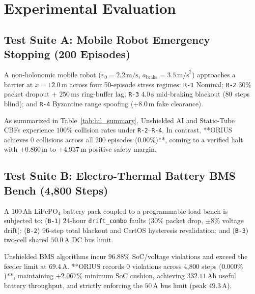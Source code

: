 \documentclass[conference]{IEEEtran}
\begin{document}
\section{Experimental Evaluation}

\subsection{Test Suite A: Mobile Robot Emergency Stopping (200 Episodes)}
A non-holonomic mobile robot ($v_0 = 2.2\,\text{m/s}$, $a_{\mathrm{brake}} = 3.5\,\text{m/s}^2$) approaches a barrier at $x = 12.0\,\text{m}$ across four 50-episode stress regimes: \texttt{R-1} Nominal; \texttt{R-2} 30\% packet dropout + $250\,\text{ms}$ ring-buffer lag; \texttt{R-3} $4.0\,\text{s}$ mid-braking blackout (80 steps blind); and \texttt{R-4} Byzantine range spoofing ($+8.0\,\text{m}$ fake clearance).

As summarized in Table~\ref{tab:hil_summary}, Unshielded AI and Static-Tube CBFs experience $100\%$ collision rates under \texttt{R-2}--\texttt{R-4}. In contrast, **ORIUS achieves 0 collisions across all 200 episodes ($0.00\%$)**, coming to a verified halt with $+0.860\,\text{m}$ to $+4.937\,\text{m}$ positive safety margin.

\subsection{Test Suite B: Electro-Thermal Battery BMS Bench (4,800 Steps)}
A $100\,\text{Ah}$ $\text{LiFePO}_4$ battery pack coupled to a programmable load bench is subjected to: (\texttt{B-1}) 24-hour \texttt{drift\_combo} faults ($30\%$ packet drop, $\pm 8\%$ voltage drift); (\texttt{B-2}) 96-step total blackout and CertOS hysteresis revalidation; and (\texttt{B-3}) two-cell shared $50.0\,\text{A}$ DC bus limit. 

Unshielded BMS algorithms incur $96.88\%$ SoC/voltage violations and exceed the feeder limit at $69.4\,\text{A}$. **ORIUS records 0 violations across 4,800 steps ($0.000\%$)**, maintaining $+2.067\%$ minimum SoC cushion, achieving $332.11\,\text{Ah}$ useful battery throughput, and strictly enforcing the $50\,\text{A}$ bus limit (peak $49.3\,\text{A}$).
\end{document}
